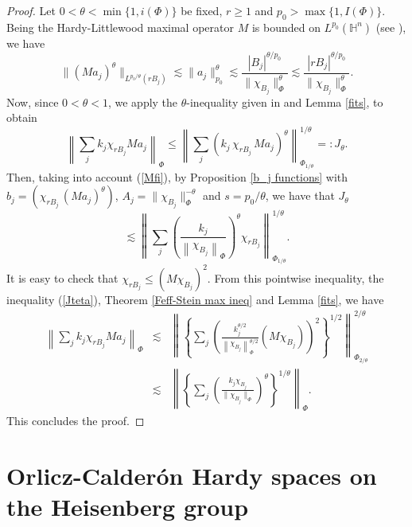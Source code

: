 \documentclass[oneside,10pt]{article}
\begin{document}
\begin{proof}
Let $0 < \theta < \min\{1, i(\Phi) \}$ be fixed, $r \geq 1$ and $p_{0} > \max \{1, I(\Phi) \}$. Being the Hardy-Littlewood 
maximal operator $M$ is bounded on $L^{p_0}(\mathbb{H}^n)$ (see \cite[Theorem 1, p. 13]{Elias}), we have
\begin{equation} \label{Mfi}
\|  (Ma_j)^{\theta} \|_{L^{p_{0}/\theta}(r B_j)} \lesssim \| a_j \|_{p_0}^{\theta} \lesssim 
\frac{|B_j |^{\theta/p_0}}{\| \chi_{B_j} \|_{\Phi}^{\theta}} 
\lesssim \frac{ |r B_j |^{\theta/p_0}}{\| \chi_{ B_j} \|_{\Phi}^{\theta}}.
\end{equation}
Now, since $0 < \theta < 1$, we apply the $\theta$-inequality given in \cite[1.1.4 (a), on p. 12]{Grafakos} and Lemma \ref{fits}, to obtain
\[
\left\| \sum_{j} k_j \chi_{r B_j} M a_j \right\|_{\Phi} \leq 
\left\| \sum_{j} \left(k_j \, \chi_{r B_{j}} \, Ma_j \right)^{\theta} \right\|^{1/\theta}_{\Phi_{1/\theta}} =:J_{\theta}.
\]
Then, taking into account (\ref{Mfi}), by Proposition \ref{b_j functions} with $b_j = \left( \chi_{r B_{j}} \, (Ma_j)^{\theta} \right)$, 
$A_j = \| \chi_{ B_{j}} \|_{\Phi}^{-\theta}$ and $s= p_0/\theta$, we have that $J_{\theta}$
\begin{equation} \label{Jteta}
\lesssim \left\| \sum_{j} \left( \frac{k_j}{\left\| \chi_{ B_{j}} \right\|_{\Phi}} \right)^{\theta} 
\chi_{r B_{j}} \right\|^{1/\theta}_{\Phi_{1/\theta}}.
\end{equation}
It is easy to check that $\chi_{r B_{j}} \leq (M\chi_{B_j})^{2}$. From this pointwise inequality, the inequality (\ref{Jteta}), 
Theorem \ref{Feff-Stein max ineq} and Lemma \ref{fits}, we have
\begin{eqnarray*}
\left\| \sum_{j} k_j \chi_{r B_j} M a_j \right\|_{\Phi} &\lesssim& 
\left\| \left\{ \sum_{j} \left( \frac{k_j^{\theta/2}}{\left\| \chi_{B_{j}} \right\|^{\theta/2}_{\Phi}} 
(M\chi_{B_j}) \right)^{2}  \right\}^{1/2} \right\|^{2/\theta}_{\Phi_{2/\theta}} \\
&\lesssim& \left\| \left\{ \sum_{j} \left( \frac{ k_j \chi_{B_j}}{\| \chi_{B_j} \|_{\Phi}} \right)^{\theta} 
\right\}^{1/\theta} \right\|_{\Phi}.
\end{eqnarray*}
This concludes the proof.
\end{proof}


\section{Orlicz-Calder\'on Hardy spaces on the Heisenberg group} \label{OCH}
\end{document}
